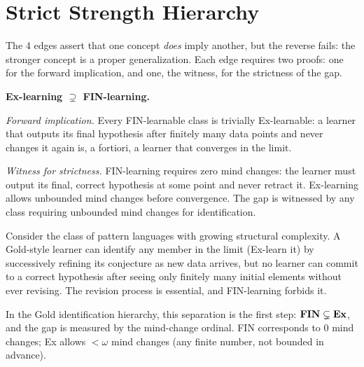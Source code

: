 
\section{Strict Strength Hierarchy}
\label{sec:strict-hierarchy}

The 4  edges assert that one concept
\emph{does} imply another, but the reverse fails: the stronger concept
is a proper generalization. Each edge requires two proofs: one for the
forward implication, and one, the witness, for the strictness of the
gap.


\begin{separation}
\textbf{Ex-learning $\supsetneq$ FIN-learning.}

\medskip\noindent
\emph{Forward implication.} Every FIN-learnable class is trivially
Ex-learnable: a learner that outputs its final hypothesis after finitely
many data points and never changes it again is, a fortiori, a learner
that converges in the limit.

\medskip\noindent
\emph{Witness for strictness.}
FIN-learning requires zero mind changes: the learner must output its
final, correct hypothesis at some point and never retract it. Ex-learning
allows unbounded mind changes before convergence. The gap is witnessed
by any class requiring unbounded mind changes for identification.

Consider the class of pattern languages with growing structural
complexity. A Gold-style learner can identify any member in the limit
(Ex-learn it) by successively refining its conjecture as new data
arrives, but no learner can commit to a correct hypothesis after seeing
only finitely many initial elements without ever revising. The revision
process is essential, and FIN-learning forbids it.

In the Gold identification hierarchy, this separation is the first step:
$\mathbf{FIN} \subsetneq \mathbf{Ex}$, and the gap is measured by the mind-change
ordinal. FIN corresponds to $0$ mind changes; Ex allows $< \omega$ mind
changes (any finite number, not bounded in advance).

\hfill\cite{Gold1967}
\end{separation}


